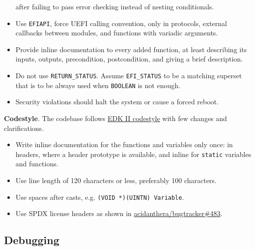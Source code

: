 \documentclass[]{article}
\providecommand{\tightlist}{%
  \setlength{\itemsep}{0pt}\setlength{\parskip}{0pt}}
\begin{document}
\begin{itemize}
after failing to pass error checking instead of nesting conditionals.
\item Use \texttt{EFIAPI}, force UEFI calling convention, only in protocols, external callbacks between
modules, and functions with variadic arguments.
\item Provide inline documentation to every added function, at least describing its inputs, outputs,
precondition, postcondition, and giving a brief description.
\item Do not use \texttt{RETURN\_STATUS}. Assume \texttt{EFI\_STATUS} to be a matching superset that is
to be always used when \texttt{BOOLEAN} is not enough.
\item Security violations should halt the system or cause a forced reboot.
\end{itemize}

\textbf{Codestyle}. The codebase follows
\href{https://github.com/tianocore/tianocore.github.io/wiki/Code-Style-C}{EDK II codestyle} with few changes
and clarifications.
\begin{itemize}
\tightlist
\item Write inline documentation for the functions and variables only once: in headers, where a header prototype
is available, and inline for \texttt{static} variables and functions.
\item Use line length of 120 characters or less, preferably 100 characters.
\item Use spaces after casts, e.g. \texttt{(VOID *)(UINTN) Variable}.
\item Use SPDX license headers as shown in
\href{https://github.com/acidanthera/bugtracker/issues/483}{acidanthera/bugtracker\#483}.
\end{itemize}

\subsection{Debugging}\label{configuration-debug}
\end{document}
